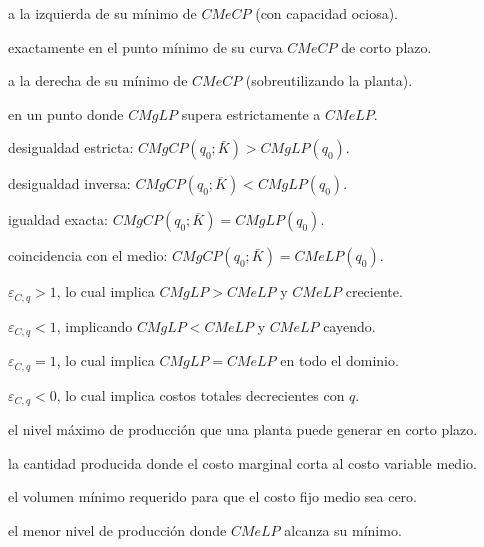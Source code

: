 \begin{opts}
    \item a la izquierda de su mínimo de $CMeCP$ (con capacidad ociosa).
    \item exactamente en el punto mínimo de su curva $CMeCP$ de corto plazo.
    \item a la derecha de su mínimo de $CMeCP$ (sobreutilizando la planta).
    \item en un punto donde $CMgLP$ supera estrictamente a $CMeLP$.
\end{opts}

\begin{opts}
    \item desigualdad estricta: $CMgCP(q_0; \bar{K}) > CMgLP(q_0)$.
    \item desigualdad inversa: $CMgCP(q_0; \bar{K}) < CMgLP(q_0)$.
    \item igualdad exacta: $CMgCP(q_0; \bar{K}) = CMgLP(q_0)$.
    \item coincidencia con el medio: $CMgCP(q_0; \bar{K}) = CMeLP(q_0)$.
\end{opts}

\begin{opts}
    \item $\varepsilon_{C,q} > 1$, lo cual implica $CMgLP > CMeLP$ y $CMeLP$ creciente.
    \item $\varepsilon_{C,q} < 1$, implicando $CMgLP < CMeLP$ y $CMeLP$ cayendo.
    \item $\varepsilon_{C,q} = 1$, lo cual implica $CMgLP = CMeLP$ en todo el dominio.
    \item $\varepsilon_{C,q} < 0$, lo cual implica costos totales decrecientes con $q$.
\end{opts}

\begin{opts}
    \item el nivel máximo de producción que una planta puede generar en corto plazo.
    \item la cantidad producida donde el costo marginal corta al costo variable medio.
    \item el volumen mínimo requerido para que el costo fijo medio sea cero.
    \item el menor nivel de producción donde $CMeLP$ alcanza su mínimo.
\end{opts}

